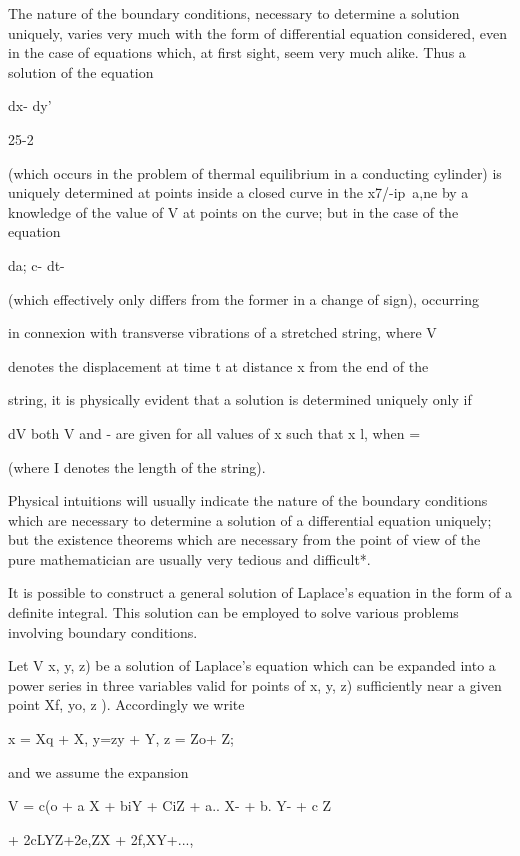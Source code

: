 The nature of the boundary conditions, necessary to determine a
solution uniquely, varies very much with the form of differential
equation considered, even in the case of equations which, at first
sight, seem very much alike. Thus a solution of the equation

dx- dy'

25-2

%
%

(which occurs in the problem of thermal equilibrium in a conducting
cylinder) is uniquely determined at points inside a closed curve in
the x7/-ip\ a,ne by a knowledge of the value of V at points on the
curve; but in the case of the equation

da; c- dt-

(which effectively only differs from the former in a change of sign),
occurring

in connexion with transverse vibrations of a stretched string, where V

denotes the displacement at time t at distance x from the end of the

string, it is physically evident that a solution is determined
uniquely only if

dV both V and - are given for all values of x such that x l, when =

(where I denotes the length of the string).

Physical intuitions will usually indicate the nature of the boundary
conditions which are necessary to determine a solution of a
differential equation uniquely; but the existence theorems which are
necessary from the point of view of the pure mathematician are usually
very tedious and difficult*.


It is possible to construct a general solution of Laplace's equation
in the form of a definite integral. This solution can be employed to
solve various problems involving boundary conditions.

Let V x, y, z) be a solution of Laplace's equation which can be
expanded into a power series in three variables valid for points of x,
y, z) sufficiently near a given point Xf, yo, z ). Accordingly we
write

x = Xq + X, y=zy + Y, z = Zo+ Z;

and we assume the expansion

V = c(o + a X + biY + CiZ + a.. X- + b. Y- + c Z

+ 2cLYZ+2e,ZX + 2f,XY+...,

